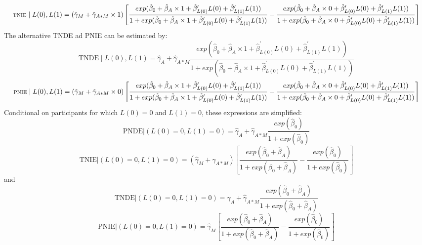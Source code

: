 \documentclass[
]{book}
\begin{document}
\[\scriptsize
\text{TNIE} \mid L(0), L(1) = \left( \hat{\gamma}_M + \hat{\gamma}_{A \ast M} \times 1 \right) \left[ \frac{exp(\hat{\beta}_0 + \hat{\beta}_A \times 1 + \hat{\beta}_{L(0)}^\prime L(0) + \hat{\beta}_{L(1)}^\prime L(1))}{1 + exp(\hat{\beta}_0 + \hat{\beta}_A \times 1 + \hat{\beta}_{L(0)}^\prime L(0) + \hat{\beta}_{L(1)}^\prime L(1))} - \frac{exp(\hat{\beta}_0 + \hat{\beta}_A \times 0 + \hat{\beta}_{L(0)}^\prime L(0) + \hat{\beta}_{L(1)}^\prime L(1))}{1 + exp(\hat{\beta}_0 + \hat{\beta}_A \times 0 + \hat{\beta}_{L(0)}^\prime L(0) + \hat{\beta}_{L(1)}^\prime L(1))}\right]\]
The alternative TNDE ad PNIE can be estimated by:
\[\text{TNDE} \mid L(0), L(1) = \hat{\gamma}_A + \hat{\gamma}_{A \ast M}\frac{exp(\hat{\beta}_0 + \hat{\beta}_A \times 1 + \hat{\beta}_{L(0)}^\prime L(0) + \hat{\beta}_{L(1)}^\prime L(1))}{1 + exp(\hat{\beta}_0 + \hat{\beta}_A \times 1 + \hat{\beta}_{L(0)}^\prime L(0) + \hat{\beta}_{L(1)}^\prime L(1))}\]
\[\scriptsize \text{PNIE} \mid L(0), L(1) = \left( \hat{\gamma}_M + \hat{\gamma}_{A \ast M} \times 0 \right) \left[ \frac{exp(\hat{\beta}_0 + \hat{\beta}_A \times 1 + \hat{\beta}_{L(0)}^\prime L(0) + \hat{\beta}_{L(1)}^\prime L(1))}{1 + exp(\hat{\beta}_0 + \hat{\beta}_A \times 1 + \hat{\beta}_{L(0)}^\prime L(0) + \hat{\beta}_{L(1)}^\prime L(1))} - \frac{exp(\hat{\beta}_0 + \hat{\beta}_A \times 0 + \hat{\beta}_{L(0)}^\prime L(0) + \hat{\beta}_{L(1)}^\prime L(1))}{1 + exp(\hat{\beta}_0 + \hat{\beta}_A \times 0 + \hat{\beta}_{L(0)}^\prime L(0) + \hat{\beta}_{L(1)}^\prime L(1))}\right]\]
Conditional on participants for which \(L(0)=0\) and \(L(1)=0\), these expressions are simplified:
\[\text{PNDE} \Big| (L(0)=0, L(1)=0) = \hat{\gamma}_A + \hat{\gamma}_{A \ast M}\frac{exp(\hat{\beta}_0)}{1 + exp(\hat{\beta}_0)}\]
\[\text{TNIE} \Big| (L(0)=0, L(1)=0) = \left( \hat{\gamma}_M + \hat{\gamma}_{A \ast M} \right) \left[ \frac{exp(\hat{\beta}_0 + \hat{\beta}_A )}{1 + exp(\hat{\beta}_0 + \hat{\beta}_A )} - \frac{exp(\hat{\beta}_0 )}{1 + exp(\hat{\beta}_0)}\right]\]
and
\[\text{TNDE} \Big| (L(0)=0, L(1)=0) = \hat{\gamma}_A + \hat{\gamma}_{A \ast M}\frac{exp(\hat{\beta}_0 + \hat{\beta}_A)}{1 + exp(\hat{\beta}_0 + \hat{\beta}_A)}\]
\[\text{PNIE} \Big| (L(0)=0, L(1)=0) = \hat{\gamma}_M \left[ \frac{exp(\hat{\beta}_0 + \hat{\beta}_A )}{1 + exp(\hat{\beta}_0 + \hat{\beta}_A )} - \frac{exp(\hat{\beta}_0 )}{1 + exp(\hat{\beta}_0)}\right]\]
\end{document}
